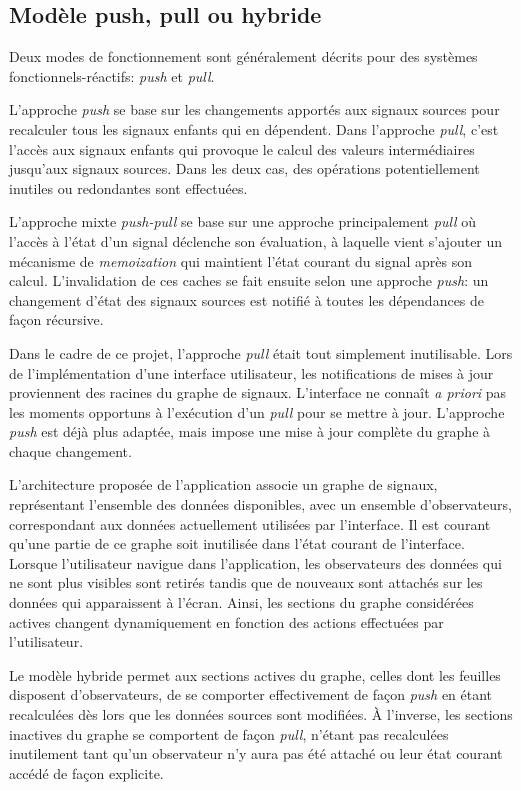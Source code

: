 \subsection{Modèle push, pull ou hybride}

Deux modes de fonctionnement sont généralement décrits pour des systèmes fonctionnels-réactifs: \emph{push} et \emph{pull}.

L'approche \emph{push} se base sur les changements apportés aux signaux sources pour recalculer tous les signaux enfants qui en dépendent. Dans l'approche \emph{pull}, c'est l'accès aux signaux enfants qui provoque le calcul des valeurs intermédiaires jusqu'aux signaux sources. Dans les deux cas, des opérations potentiellement inutiles ou redondantes sont effectuées.

L'approche mixte \emph{push-pull} se base sur une approche principalement \emph{pull} où l'accès à l'état d'un signal déclenche son évaluation, à laquelle vient s'ajouter un mécanisme de \emph{memoization} qui maintient l'état courant du signal après son calcul. L'invalidation de ces caches se fait ensuite selon une approche \emph{push}: un changement d'état des signaux sources est notifié à toutes les dépendances de façon récursive.

Dans le cadre de ce projet, l'approche \emph{pull} était tout simplement inutilisable. Lors de l'implémentation d'une interface utilisateur, les notifications de mises à jour proviennent des racines du graphe de signaux. L'interface ne connaît \emph{a priori} pas les moments opportuns à l'exécution d'un \emph{pull} pour se mettre à jour. L'approche \emph{push} est déjà plus adaptée, mais impose une mise à jour complète du graphe à chaque changement.

L'architecture proposée de l'application associe un graphe de signaux, représentant l'ensemble des données disponibles, avec un ensemble d'observateurs, correspondant aux données actuellement utilisées par l'interface. Il est courant qu'une partie de ce graphe soit inutilisée dans l'état courant de l'interface. Lorsque l'utilisateur navigue dans l'application, les observateurs des données qui ne sont plus visibles sont retirés tandis que de nouveaux sont attachés sur les données qui apparaissent à l'écran. Ainsi, les sections du graphe considérées actives changent dynamiquement en fonction des actions effectuées par l'utilisateur.

Le modèle hybride permet aux sections actives du graphe, celles dont les feuilles disposent d'observateurs, de se comporter effectivement de façon \emph{push} en étant recalculées dès lors que les données sources sont modifiées. À l'inverse, les sections inactives du graphe se comportent de façon \emph{pull}, n'étant pas recalculées inutilement tant qu'un observateur n'y aura pas été attaché ou leur état courant accédé de façon explicite.
